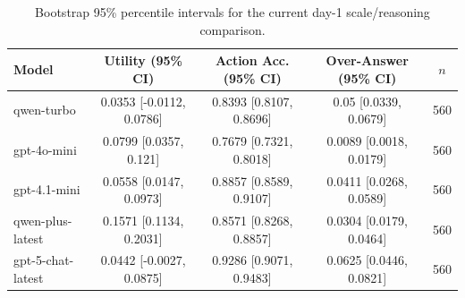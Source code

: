 \begin{table}[t]
\centering
\small
\setlength{\tabcolsep}{4.0pt}
\begin{tabular}{lcccc}
\toprule
Model & Utility (95\% CI) & Action Acc. (95\% CI) & Over-Answer (95\% CI) & $n$ \\
\midrule
qwen-turbo & 0.0353 [-0.0112, 0.0786] & 0.8393 [0.8107, 0.8696] & 0.05 [0.0339, 0.0679] & 560 \\
gpt-4o-mini & 0.0799 [0.0357, 0.121] & 0.7679 [0.7321, 0.8018] & 0.0089 [0.0018, 0.0179] & 560 \\
gpt-4.1-mini & 0.0558 [0.0147, 0.0973] & 0.8857 [0.8589, 0.9107] & 0.0411 [0.0268, 0.0589] & 560 \\
qwen-plus-latest & 0.1571 [0.1134, 0.2031] & 0.8571 [0.8268, 0.8857] & 0.0304 [0.0179, 0.0464] & 560 \\
gpt-5-chat-latest & 0.0442 [-0.0027, 0.0875] & 0.9286 [0.9071, 0.9483] & 0.0625 [0.0446, 0.0821] & 560 \\
\bottomrule
\end{tabular}
\caption{Bootstrap 95\% percentile intervals for the current day-1 scale/reasoning comparison.}
\label{tab:day1-scale-reasoning-ci-main}
\end{table}

